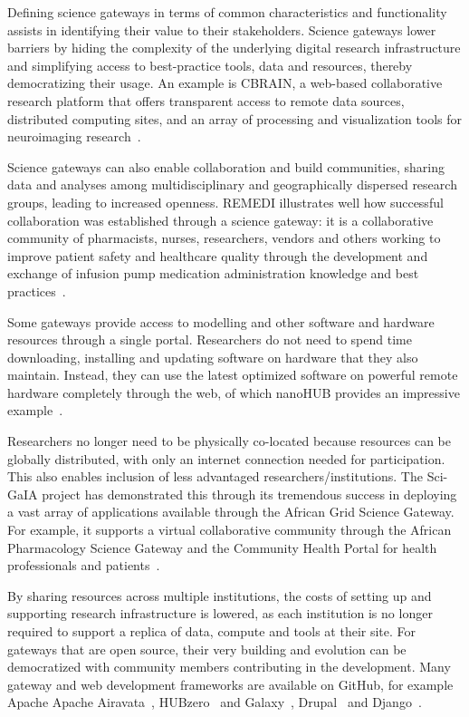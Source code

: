 \documentclass[review]{elsarticle}
\begin{document}
Defining science gateways in terms of common characteristics and functionality assists in identifying their value to their stakeholders. Science gateways lower barriers by hiding the complexity of the underlying digital research infrastructure and simplifying access to best-practice tools, data and resources, thereby democratizing their usage. 
An example is CBRAIN, a web-based collaborative research platform that offers transparent access to remote data sources, distributed computing sites, and an array of processing and visualization tools for neuroimaging research~\cite{cbrain-70}. 

Science gateways can also enable collaboration and build communities, sharing data and analyses among multidisciplinary and geographically dispersed research groups, leading to increased openness. REMEDI illustrates well  how successful collaboration was established through a science gateway: it is a collaborative community of pharmacists, nurses, researchers, vendors and others working to improve patient safety and healthcare quality through the development and exchange of infusion pump medication administration knowledge and best practices~\cite{remedi-71}.  

Some  gateways provide access to  modelling and other software and hardware resources through a single portal. Researchers do not need to spend time downloading, installing and updating software on hardware that they also maintain. 
Instead, they can use the latest optimized software on powerful remote hardware completely through the web, of which nanoHUB provides an impressive example~\cite{nanohub-33}. 

Researchers no longer need to be physically co-located because resources can be globally distributed, with only an internet connection needed for participation. This also enables inclusion of less advantaged researchers/institutions. The Sci-GaIA project has demonstrated this through its tremendous success in deploying a vast array of applications available through the African Grid Science Gateway. For example, it supports a virtual collaborative community through the African Pharmacology Science Gateway and the Community Health Portal for health professionals and patients~\cite{sci-gaia-22}. 

By sharing resources across multiple institutions, the costs of setting up and supporting research infrastructure is lowered, as each institution is no longer required to support a replica of data, compute and tools at their site. For gateways that are open source, their very building and evolution can be democratized with community members contributing in the development. Many gateway and web development frameworks are available on GitHub, for example Apache Apache Airavata~\cite{airavata}, HUBzero~\cite{hubzero-55} and  Galaxy~\cite{galaxy}, Drupal~\cite{drupal} and Django~\cite{django}.
\end{document}
